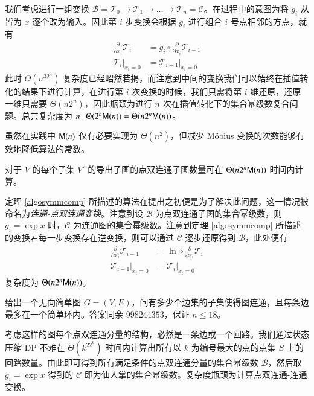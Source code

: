 我们考虑进行一组变换 $\mathscr B = \mathscr T_0 \rightarrow \mathscr T_1\rightarrow \dots \rightarrow \mathscr T_n = \mathscr C$。在过程中的意图为将 $g_i$ 从皆为 $x$ 逐个改为输入。因此第 $i$ 步变换会根据 $g_i$ 进行组合 $i$ 号点相邻的方点，就有
\begin{align*}
\frac{\partial}{\partial x_i} \mathscr T_{i} &= g_i \circ \frac{\partial}{\partial x_i}\mathscr T_{i-1}\\
\left.\mathscr T_i\right|_{x_i=0} &= \left.\mathscr T_{i-1}\right|_{x_i=0}
\end{align*}
此时 $\Theta(n^32^n)$ 复杂度已经昭然若揭，而注意到中间的变换我们可以始终在插值转化的结果下进行计算，在进行第 $i$ 次变换的时候，我们只需将第 $i$ 维还原，还原一维只需要 $\Theta(n2^n)$，因此瓶颈为进行 $n$ 次在插值转化下的集合幂级数复合问题。总共复杂度为 $n\cdot \Theta(2^n\mathsf M(n)) = \Theta(n2^n\mathsf M(n))$。

虽然在实践中 $\mathsf M(n)$ 仅有必要实现为 $\Theta(n^2)$，但减少 M\"obius 变换的次数能够有效地降低算法的常数。

\begin{lemma}
对于 $V$ 的每个子集 $V'$ 的导出子图的点双连通子图数量可在 $\Theta(n2^n\mathsf M(n))$ 时间内计算。
\end{lemma}

定理 \ref{algosymmcomp} 所描述的算法在提出之初便是为了解决此问题，这一情况被命名为\emph{连通-点双连通变换}。注意到设 $\mathscr B$ 为点双连通子图的集合幂级数，则 $g_i = \exp x$ 时，$\mathscr C$ 为连通图的集合幂级数。注意到定理 \ref{algosymmcomp} 所描述的变换若每一步变换存在逆变换，则可以通过 $\mathscr C$ 逐步还原得到 $\mathscr B$，此处便有
\begin{align*}
\frac{\partial}{\partial x_i} \mathscr T_{i-1} &= \ln \circ \frac{\partial}{\partial x_i}\mathscr T_i\\
\left.\mathscr T_{i-1}\right|_{x_i=0} &= \left.\mathscr T_i\right|_{x_i=0}
\end{align*}
复杂度为 $\Theta(n2^n\mathsf M(n))$。

\begin{problem}
给出一个无向简单图 $G=(V,E)$，问有多少个边集的子集使得图连通，且每条边最多在一个简单环内。答案同余 $998244353$，保证 $n\le 18$。
\end{problem}

\begin{solution}
考虑这样的图每个点双连通分量的结构，必然是一条边或一个回路。我们通过状态压缩 DP 不难在 $\Theta(k^22^k)$ 时间内计算出所有以 $k$ 为编号最大的点的点集 $S$ 上的回路数量。由此即可得到所有满足条件的点双连通分量的集合幂级数 $\mathscr B$，然后取 $g_i = \exp x$ 得到的 $\mathscr C$ 即为仙人掌的集合幂级数。复杂度瓶颈为计算点双连通-连通变换。
\end{solution}

